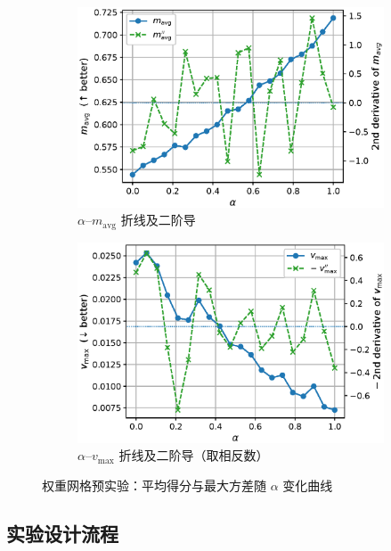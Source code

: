 \documentclass[10pt]{article} %
\numberwithin{equation}{section}
\begin{document}
\begin{figure}[t]
  \centering
  \begin{subfigure}{0.49\linewidth}
    \centering
    \includegraphics[width=\linewidth]{figures/4graph/alpha_vs_median.eps}
    \caption{$\alpha$–$m_{\mathrm{avg}}$ 折线及二阶导}
    \label{fig:alpha-vs-median}
  \end{subfigure}\hfill
  \begin{subfigure}{0.49\linewidth}
    \centering
    \includegraphics[width=\linewidth]{figures/4graph/alpha_vs_variance.eps}
    \caption{$\alpha$–$v_{\max}$ 折线及二阶导（取相反数）}
    \label{fig:alpha-vs-var}
  \end{subfigure}
  \caption{权重网格预实验：平均得分与最大方差随 $\alpha$ 变化曲线}
\end{figure}

\subsection{\textcolor[rgb]{0.00,0.07,1.00}{实验设计流程}}\label{sec:exp_pipeline}
\end{document}
